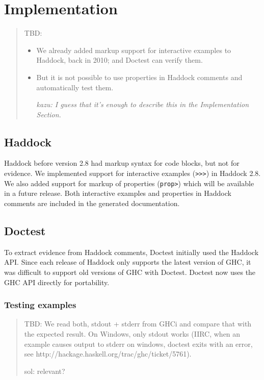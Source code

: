 \documentclass[preprint]{sigplanconf}
\begin{document}
\section{Implementation}

\begin{quote}
TBD:
\begin{itemize}
    \item
        We already added markup support for interactive examples to
        Haddock, back in 2010; and Doctest can verify them.
    \item
        But it is not possible to use properties in Haddock comments
        and automatically test them.

    \emph{kazu: I guess that it's enough to describe this in the Implementation Section.}
\end{itemize}
\end{quote}

\subsection{Haddock}
\label{sec:haddock}

Haddock before version 2.8 had markup syntax for
code blocks, but not for evidence.
We implemented support for interactive examples ({\tt >>>}) in
Haddock 2.8.
We also added support for markup of properties ({\tt prop>}) which
will be available in a future release.
Both interactive examples and properties in Haddock comments are
included in the generated documentation.

\subsection{Doctest}
\label{sec:doctest}

To extract evidence from Haddock comments,
Doctest initially used the Haddock API.
Since each release of Haddock only supports the latest version of GHC,
it was difficult to support old versions of GHC with Doctest.
Doctest now uses the GHC API directly for portability.

\subsubsection{Testing examples}

\begin{quote}
    TBD: We read both, stdout + stderr from GHCi and compare that with the
    expected result.  On Windows, only stdout works (IIRC, when an
    example causes output to stderr on windows, doctest exits with an
    error, see http://hackage.haskell.org/trac/ghc/ticket/5761).

    sol: relevant?
\end{quote}
\end{document}
